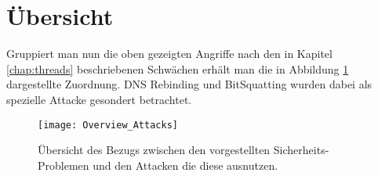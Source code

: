 \section{Übersicht}
Gruppiert man nun die oben gezeigten Angriffe nach den in Kapitel \ref{chap:threads} beschriebenen Schwächen erhält man die in Abbildung \ref{img:attacks-summary} dargestellte Zuordnung. DNS Rebinding und BitSquatting wurden dabei als spezielle Attacke gesondert betrachtet.

\begin{figure}[!hb]
    \centering
    \texttt{[image: Overview\_Attacks]}
    \caption{Übersicht des Bezugs zwischen den vorgestellten Sicherheits-Problemen und den Attacken die diese ausnutzen.}
    \label{img:attacks-summary}
\end{figure}

